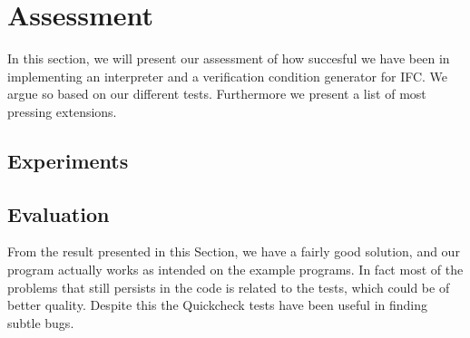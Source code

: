 \section{Assessment}
In this section, we will present our assessment of how succesful we have been in implementing an interpreter and a verification condition generator for IFC. We argue so based on our different tests. Furthermore we present a list of most pressing extensions.

\subsection{Experiments}


\subsection{Evaluation}
From the result presented in this Section, we have a fairly good solution, and our program actually works as intended on the example programs.
In fact most of the problems that still persists in the code is related to the tests, which could be of better quality. Despite this the Quickcheck tests have been useful in finding subtle bugs.

